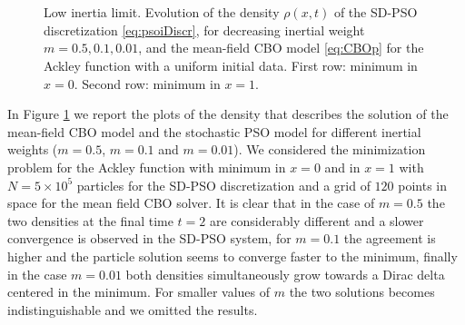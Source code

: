 \documentclass{ims9x6}
\begin{document}
\begin{figure}[htb]
\begin{minipage}{\linewidth}
\centering
{}\
 \
 \\
\
 \
\caption{Low inertia limit. Evolution of the density $\rho(x,t)$ of the SD-PSO discretization \eqref{eq:psoiDiscr}, for decreasing inertial weight $m = 0.5, 0.1, 0.01$, and the mean-field CBO model \eqref{eq:CBOp} for the Ackley function with a uniform initial data. First row: minimum in $x = 0$. Second row: minimum in $x = 1$.}
\label{Fig7}
\end{minipage}
\end{figure}
In Figure \ref{Fig7} we report the plots of the density that describes the solution of the mean-field CBO model and the stochastic PSO model for different inertial weights ($m = 0.5$, $m = 0.1$ and $m = 0.01$). We considered the minimization problem for the Ackley function with minimum in $x = 0$ and in $x = 1$ with $N=5 \times 10^{5}$ particles for the SD-PSO discretization and a grid of $120$ points in space for the mean field CBO solver. It is clear that in the case of $ m = 0.5 $ the two densities at the final time $ t = 2 $ are considerably different and a slower convergence is observed in the SD-PSO system, for $ m = 0.1 $ the agreement is higher and the particle solution seems to converge faster to the minimum, finally in the case $ m = 0.01 $ both densities simultaneously grow towards a Dirac delta centered in the minimum. For smaller values of $m$ the two solutions becomes indistinguishable and we omitted the results.
\end{document}
